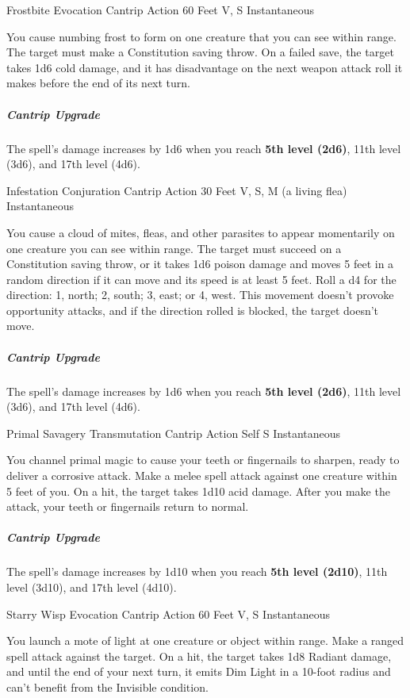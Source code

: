 \documentclass[letterpaper,openany,oneside,twocolumn]{book}
\begin{document}
\DndSpellHeader
  {Frostbite}
  {Evocation Cantrip}
  {Action}
  {60 Feet}
  {V, S}
  {Instantaneous}

You cause numbing frost to form on one creature that you can see within range. The target must make a Constitution saving throw. On a failed save, the target takes 1d6 cold damage, and it has disadvantage on the next weapon attack roll it makes before the end of its next turn.

\subparagraph*{Cantrip Upgrade} The spell's damage increases by 1d6 when you reach \textbf{5th level (2d6)}, 11th level (3d6), and 17th level (4d6).

\DndSpellHeader
  {Infestation}
  {Conjuration Cantrip}
  {Action}
  {30 Feet}
  {V, S, M (a living flea)}
  {Instantaneous}

You cause a cloud of mites, fleas, and other parasites to appear momentarily on one creature you can see within range. The target must succeed on a Constitution saving throw, or it takes 1d6 poison damage and moves 5 feet in a random direction if it can move and its speed is at least 5 feet. Roll a d4 for the direction: 1, north; 2, south; 3, east; or 4, west. This movement doesn't provoke opportunity attacks, and if the direction rolled is blocked, the target doesn't move.

\subparagraph*{Cantrip Upgrade} The spell's damage increases by 1d6 when you reach \textbf{5th level (2d6)}, 11th level (3d6), and 17th level (4d6).

\DndSpellHeader
  {Primal Savagery}
  {Transmutation Cantrip}
  {Action}
  {Self}
  {S}
  {Instantaneous}

You channel primal magic to cause your teeth or fingernails to sharpen, ready to deliver a corrosive attack. Make a melee spell attack against one creature within 5 feet of you. On a hit, the target takes 1d10 acid damage. After you make the attack, your teeth or fingernails return to normal.

\subparagraph*{Cantrip Upgrade} The spell's damage increases by 1d10 when you reach \textbf{5th level (2d10)}, 11th level (3d10), and 17th level (4d10).

\DndSpellHeader
  {Starry Wisp}
  {Evocation Cantrip}
  {Action}
  {60 Feet}
  {V, S}
  {Instantaneous}

You launch a mote of light at one creature or object within range. Make a ranged spell attack against the target. On a hit, the target takes 1d8 Radiant damage, and until the end of your next turn, it emits Dim Light in a 10-foot radius and can't benefit from the Invisible condition.
\end{document}
